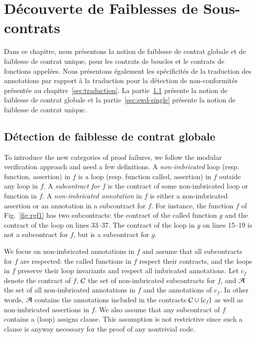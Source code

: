 
\chapter{Découverte de Faiblesses de Sous-contrats}
\label{sec:swd}

\chapterintro

Dans ce chapitre, nous présentons la notion de faiblesse de contrat globale et
de faiblesse de contrat unique, pour les contrats de boucles et le contrats de
fonctions appelées.
Nous présentons également les spécificités de la traduction des annotations par
rapport à la traduction pour la détection de non-conformités présentée au
chapitre~\ref{sec:traduction}.
La partie~\ref{sec:swd-global} présente la notion de faiblesse de contrat
globale et la partie~\ref{sec:swd-single} présente la notion de faiblesse de
contrat unique.


\section{Détection de faiblesse de contrat globale}
\label{sec:swd-global}


To introduce the new categories of proof failures, we follow
the modular verification approach and need a few definitions.
A \emph{non-imbricated} loop (resp. function, assertion) in $f$ is a loop
 (resp. function called, assertion) in $f$ outside any loop in
$f$. A \emph{subcontract for $f$} is the contract of some non-imbricated loop or function
 in $f$. A \emph{non-imbricated annotation} in $f$ is either a
non-imbricated assertion or an annotation in a subcontract for $f$.
For instance, the function $f$ of Fig.~\ref{fig:rgf1} has two subcontracts:
the contract of the called function $g$ and the contract of the loop on lines 33--37.
The contract of the loop in $g$ on lines 15--19 is not a subcontract for $f$, but is a subcontract for $g$.

We focus on non-imbricated annotations in $f$ and assume  that all subcontracts for $f$ are respected:
the called functions in $f$ respect their contracts, and the loops in $f$  preserve their loop invariants
and respect all imbricated annotations.
Let $c_f$ denote the contract of $f$,
${\mathcal{C}}$ the set of non-imbricated subcontracts for $f$,
and ${\mathcal{A}}$ the set of all non-imbricated annotations in $f$ and the annotations of $c_f$.
In other words, ${\mathcal{A}}$ contains  
the annotations included in the contracts ${\mathcal{C}}\cup\{c_f\}$ as well as non-imbricated  assertions in $f$.
We also assume that any subcontract of $f$ contains a (loop) assigns clause.
This assumption is not restrictive since such a clause is anyway necessary 
for the proof of any nontrivial code.


